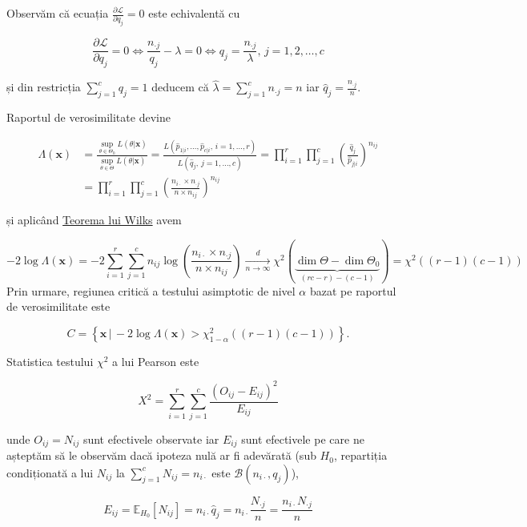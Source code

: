 \documentclass[]{article}
\begin{document}
Observăm că ecuația \(\frac{\partial \mathcal{L}}{\partial q_{j}} = 0\)
este echivalentă cu

\[
\frac{\partial \mathcal{L}}{\partial q_{j}} = 0 \iff \frac{n_{\cdot j}}{q_j} - \lambda = 0 \iff q_{j} = \frac{n_{\cdot j}}{\lambda}, \, j =1,2,\ldots,c
\]

și din restricția \(\sum_{j = 1}^{c}q_{j} = 1\) deducem că
\(\hat{\lambda} = \sum_{j = 1}^{c}n_{\cdot j} = n\) iar
\(\boxed{\hat{q}_j = \frac{n_{\cdot j}}{n}}\).

Raportul de verosimilitate devine

\begin{align*}
  \Lambda(\mathbf{x})&=\frac{\sup_{\theta\in\Theta_0}L(\theta|\mathbf{x})}{\sup_{\theta\in\Theta}L(\theta|\mathbf{x})} = \frac{L(\hat{p}_{1|i},\ldots, \hat{p}_{c|i},\,i = 1,\ldots, r)}{L(\hat{q}_{j},\, j = 1,\ldots,c)}= \prod_{i = 1}^{r}\prod_{j = 1}^{c} \left(\frac{\hat{q}_{j}}{\hat{p}_{j|i}}\right)^{n_{ij}} \\
  &= \prod_{i = 1}^{r}\prod_{j = 1}^{c} \left(\frac{n_{i\cdot}\times n_{\cdot j}}{n\times n_{ij}}\right)^{n_{ij}}
\end{align*}

și aplicând
\href{https://en.wikipedia.org/wiki/Likelihood-ratio_test}{Teorema lui
Wilks} avem

\[
  -2\log \Lambda(\mathbf{x}) = -2\sum_{i = 1}^{r}\sum_{j = 1}^{c} n_{ij}\log\left(\frac{n_{i\cdot}\times n_{\cdot j}}{n\times n_{ij}}\right) \underset{n\to\infty}{\overset{d}{\longrightarrow}}\chi^2(\underbrace{\dim{\Theta} - \dim{\Theta_0}}_{(rc-r)-(c-1)}) = \chi^2((r-1)(c-1))
\] Prin urmare, regiunea critică a testului asimptotic de nivel
\(\alpha\) bazat pe raportul de verosimilitate este

\[
  C = \left\{\mathbf{x} \,|\, -2\log \Lambda(\mathbf{x}) > \chi^2_{1-\alpha}((r-1)(c-1))\right\}.
\]

Statistica testului \(\chi^2\) a lui Pearson este

\[
  X^2 = \sum_{i = 1}^{r}\sum_{j = 1}^{c}\frac{(O_{ij} - E_{ij})^2}{E_{ij}}
\]

unde \(O_{ij} = N_{ij}\) sunt efectivele observate iar \(E_{ij}\) sunt
efectivele pe care ne așteptăm să le observăm dacă ipoteza nulă ar fi
adevărată (sub \(H_0\), repartiția condiționată a lui \(N_{ij}\) la
\(\sum_{j = 1}^{c}N_{ij} = n_{i\cdot}\) este
\(\mathcal{B}(n_{i\cdot},q_{j})\)),

\[
  E_{ij} = \mathbb{E}_{H_0}[N_{ij}] = n_{i\cdot} \hat{q}_j = n_{i\cdot}\frac{N_{\cdot j}}{n} = \frac{n_{i\cdot}N_{\cdot j}}{n}
\]
\end{document}
